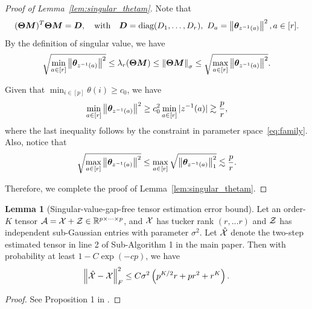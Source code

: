 \documentclass[lettersize,onecolumn,journal]{IEEEtran}
\theoremstyle{definition}
\newtheorem{lem}{Lemma}
\theoremstyle{definition}
\newcommand{\of}[1]{\left(#1\right)}
\begin{document}
\begin{proof}[Proof of Lemma~\ref{lem:singular_thetam}] Note that 
\begin{equation}
    (\boldsymbol{\Theta}\bm M)^T \boldsymbol{\Theta} \bm M = \bm{D}, \quad \text{with} \quad \bm{D} = \text{diag}(D_1,\ldots, D_r), \ D_a = \left\lVert\boldsymbol{\theta}_{z^{-1}(a)}\right\rVert^2, a \in [r].
\end{equation}
By the definition of singular value, we have 
\begin{equation}
     \sqrt{\min_{a \in [r]}\left\lVert \boldsymbol{\theta}_{ z^{-1}(a)} \right\rVert^2 } \leq \lambda_r(\boldsymbol{\Theta} \bm M) \leq \left\lVert\boldsymbol{\Theta}\bm M\right\rVert_{\sigma} \leq \sqrt{ \max_{a \in [r]}\left\lVert \boldsymbol{\theta}_{ z^{-1}(a)} \right\rVert^2}.
\end{equation}


Given that $\min_{i \in [p]}\theta(i) \geq c_0$, we have  
\begin{equation}
   \min_{a \in [r]} \left\lVert \boldsymbol{\theta}_{ z^{-1}(a)} \right\rVert^2 \geq c_0^2 \min_{a \in [r]} |z^{-1}(a)| \gtrsim \frac{p}{r},
\end{equation}
where the last inequality follows by the constraint in parameter space~\eqref{eq:family}. Also, notice that 
\begin{equation}
    \sqrt{\max_{a \in [r]}\left\lVert \boldsymbol{\theta}_{ z^{-1}(a)} \right\rVert^2 } \leq \max_{a \in [r]} \sqrt{ \left\lVert \boldsymbol{\theta}_{ z^{-1}(a)} \right\rVert^2_1} \lesssim \frac{p}{r}.
\end{equation}

 Therefore, we complete the proof of Lemma~\ref{lem:singular_thetam}.
\end{proof}


\begin{lem}[Singular-value-gap-free tensor estimation error bound]\label{lem:two-step_esterror} Let an order-$K$ tensor $\mathcal{A} = \mathcal{X} + \mathcal{Z} \in \mathbb{R}^{p \times \cdots \times p}$, and $\mathcal{X}$ has tucker rank $(r,...r)$ and $\mathcal{Z}$ has independent sub-Gaussian entries with parameter $\sigma^2$. Let $\hat {\mathcal{X}}$ denote the two-step estimated tensor in line 2 of Sub-Algorithm 1 in the main paper. Then with probability at least $1 - C \exp\of{- cp }$, we have
\begin{align}
    \onorm{\hat \tX - \tX}_F^2 \leq C \sigma^2 \of{ p^{K/2}r + pr^2 + r^K }.
\end{align}
\end{lem}

\begin{proof}
See Proposition 1 in \cite{han2020exact}.
\end{proof}
\end{document}
